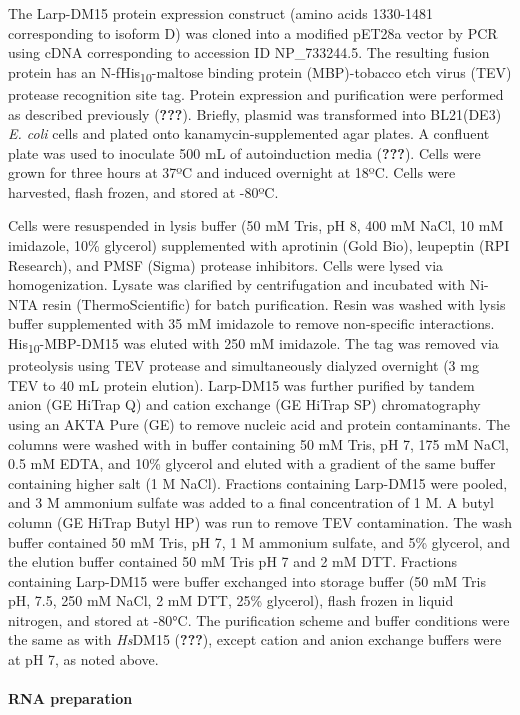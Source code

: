 \documentclass[12pt,oneside]{reedthesis}
\begin{document}
The Larp-DM15 protein expression construct (amino acids 1330-1481 corresponding to isoform D) was cloned into a modified pET28a vector by PCR using cDNA corresponding to accession ID NP\_733244.5. The resulting fusion protein has an N-fHis\textsubscript{10}-maltose binding protein (MBP)-tobacco etch virus (TEV) protease recognition site tag. Protein expression and purification were performed as described previously ({\textbf{???}}). Briefly, plasmid was transformed into BL21(DE3) \emph{E. coli} cells and plated onto kanamycin-supplemented agar plates. A confluent plate was used to inoculate 500 mL of autoinduction media ({\textbf{???}}). Cells were grown for three hours at 37ºC and induced overnight at 18ºC. Cells were harvested, flash frozen, and stored at -80ºC.

Cells were resuspended in lysis buffer (50 mM Tris, pH 8, 400 mM NaCl, 10 mM imidazole, 10\% glycerol) supplemented with aprotinin (Gold Bio), leupeptin (RPI Research), and PMSF (Sigma) protease inhibitors. Cells were lysed via homogenization. Lysate was clarified by centrifugation and incubated with Ni-NTA resin (ThermoScientific) for batch purification. Resin was washed with lysis buffer supplemented with 35 mM imidazole to remove non-specific interactions. His\textsubscript{10}-MBP-DM15 was eluted with 250 mM imidazole. The tag was removed via proteolysis using TEV protease and simultaneously dialyzed overnight (3 mg TEV to 40 mL protein elution). Larp-DM15 was further purified by tandem anion (GE HiTrap Q) and cation exchange (GE HiTrap SP) chromatography using an AKTA Pure (GE) to remove nucleic acid and protein contaminants. The columns were washed with in buffer containing 50 mM Tris, pH 7, 175 mM NaCl, 0.5 mM EDTA, and 10\% glycerol and eluted with a gradient of the same buffer containing higher salt (1 M NaCl). Fractions containing Larp-DM15 were pooled, and 3 M ammonium sulfate was added to a final concentration of 1 M. A butyl column (GE HiTrap Butyl HP) was run to remove TEV contamination. The wash buffer contained 50 mM Tris, pH 7, 1 M ammonium sulfate, and 5\% glycerol, and the elution buffer contained 50 mM Tris pH 7 and 2 mM DTT. Fractions containing Larp-DM15 were buffer exchanged into storage buffer (50 mM Tris pH, 7.5, 250 mM NaCl, 2 mM DTT, 25\% glycerol), flash frozen in liquid nitrogen, and stored at -80°C. The purification scheme and buffer conditions were the same as with \emph{Hs}DM15 ({\textbf{???}}), except cation and anion exchange buffers were at pH 7, as noted above.

\hypertarget{rna-preparation}{%
\paragraph{RNA preparation}\label{rna-preparation}}
\end{document}
